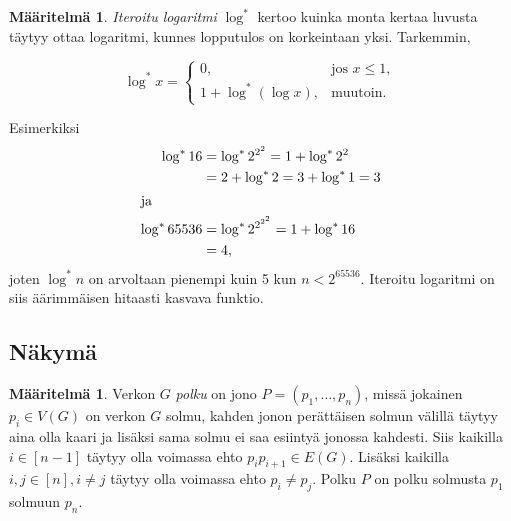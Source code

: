 \documentclass[finnish]{tktltiki2}
\theoremstyle{definition}
\newtheorem{maar}[lau]{Määritelmä}
\theoremstyle{remark}
\begin{document}
\begin{maar}
    \emph{Iteroitu logaritmi} $\log^*$ kertoo kuinka monta kertaa luvusta täytyy ottaa
    logaritmi, kunnes lopputulos on korkeintaan yksi. Tarkemmin,

    \begin{equation*}
        \log^* x =
          \begin{cases}
              0,                   &\text{jos } x \leq 1, \\
              1 + \log^* (\log x), &\text{muutoin.}
          \end{cases}
    \end{equation*}
\end{maar}

Esimerkiksi
%
\begin{align*}
    \log^* 16 &= \log^* 2^{2^2} = 1 + \log^* 2^2 \\
              &= 2+ \log^* 2 = 3 + \log^* 1 = 3 \\
\intertext{ja}
    \log^* 65536 &= \log^* 2^{2^{2^2}} = 1 + \log^* 16 \\
                 &= 4,
\end{align*}
%
joten $\log^* n$ on arvoltaan pienempi kuin 5 kun $n < 2^{65536}$. Iteroitu
logaritmi on siis äärimmäisen hitaasti kasvava funktio.

\subsection{Näkymä}

\begin{maar}
    Verkon $G$ \emph{polku} on jono $P = (p_1, \dots, p_n)$, missä jokainen
    $p_i \in V(G)$ on verkon $G$ solmu, kahden jonon perättäisen solmun välillä
    täytyy aina olla kaari ja lisäksi sama solmu ei saa esiintyä jonossa
    kahdesti. Siis kaikilla $i \in [n-1]$ täytyy olla voimassa ehto $p_i
    p_{i+1} \in E(G)$. Lisäksi kaikilla $i,j \in [n], i \neq j$ täytyy olla
    voimassa ehto $p_i \neq p_j$. Polku $P$ on polku solmusta $p_1$ solmuun
    $p_n$.
\end{maar}

\begin{center}
\end{center}
\end{document}
